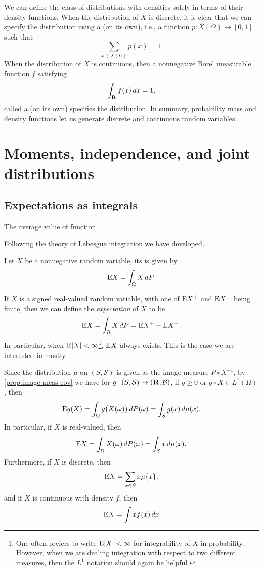 We can define the class of distributions with densities solely in terms of their density functions. When the distribution of $X$ is discrete, it is clear that we can specify the distribution using a  (on its own), i.e., a function $p\colon X(\Omega) \to [0,1]$ such that \[\sum_{x\in X(\Omega)} p(x) = 1.\] When the distribution of $X$ is continuous, then a nonnegative Borel measurable function $f$ satisfying \[
    \int_{\mathbf{R}} f(x)\,dx = 1,
\] called a  (on its own) specifies the distribution. In summary, probability mass and density functions let us generate discrete and continuous random variables.


\section{Moments, independence, and joint distributions} \label{sec:moment-indep-joint}

\subsection{Expectations as integrals}

The average value of function

Following the theory of Lebesgue integration we have developed, 

\begin{defn}
    Let $X$ be a nonnegative random variable, its  is given by \[
    \mathop{}\!\mathrm{E} X = \int_\Omega X\,dP.
    \]
    
    If $X$ is a signed real-valued random variable, with one of $\mathop{}\!\mathrm{E} X^+$ and $\mathop{}\!\mathrm{E} X^-$ being finite, then we can define the \emph{expectation} of $X$ to be \[
        \mathop{}\!\mathrm{E} X = \int_\Omega X\,dP = \mathop{}\!\mathrm{E} X^+ - \mathop{}\!\mathrm{E} X^-.
    \]
    In particular, when $\mathop{}\!\mathrm{E} \lvert X \rvert < \infty$\footnote{One often prefers to write $\mathop{}\!\mathrm{E}\lvert X \rvert < \infty$ for integrability of $X$ in probability. However, when we are dealing integration with respect to two different measures, then the $L^1$ notation should again be helpful.}, $\mathop{}\!\mathrm{E} X$ always exists. This is the case we are interested in mostly.
\end{defn}

Since the distribution $\mu$ on $(S,\mathcal{S})$ is given as the image measure $P\circ X^{-1}$, by \cref{prop:image-meas-cov} we have for $g\colon (S,\mathcal S) \to (\mathbf{R},\mathcal{B})$, if $g \geq 0$ or $g\circ X \in L^1(\Omega)$, then \[
    \mathop{}\!\mathrm{E} g(X) = \int_\Omega g\bigl(X(\omega)\bigr)\,dP(\omega) = \int_S g(x) \,d\mu(x).
\] In particular, if $X$ is real-valued, then \[
    \mathop{}\!\mathrm{E} X = \int_\Omega X(\omega)\,dP(\omega) = \int_S x\,d\mu(x).
\] Furthermore, if $X$ is discrete, then \[
    \mathop{}\!\mathrm{E} X = \sum_{x \in S} x \mu\{x\}; 
\] and if $X$ is continuous with density $f$, then \[
    \mathop{}\!\mathrm{E} X = \int x f(x)\,dx
\]

